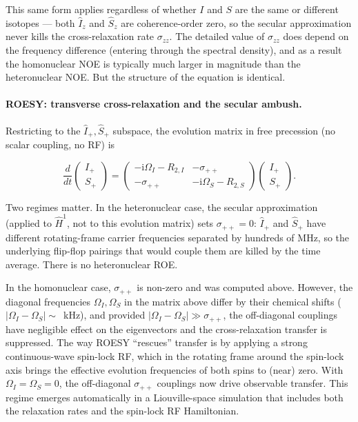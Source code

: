\documentclass[notitlepage,11pt]{article}
\newcommand{\rmi}{\mathrm{i}}
\begin{document}
This same form applies regardless of whether $I$ and $S$ are the same or different isotopes — both $\hat{I}_z$ and $\hat{S}_z$ are coherence-order zero, so the secular approximation never kills the cross-relaxation rate $\sigma_{zz}$. The detailed value of $\sigma_{zz}$ does depend on the frequency difference (entering through the spectral density), and as a result the homonuclear NOE is typically much larger in magnitude than the heteronuclear NOE. But the structure of the equation is identical.

\paragraph{ROESY: transverse cross-relaxation and the secular ambush.} Restricting to the $\hat{I}_+,\hat{S}_+$ subspace, the evolution matrix in free precession (no scalar coupling, no RF) is

\begin{equation}
\frac{d}{dt}  \left(\begin{array}{c} I_+ \\ S_+ \end{array} \right) = 
\left( \begin{array}{cc}  -\rmi \Omega_I - R_{2,I} & -\sigma_{++} \\ -\sigma_{++} &  -\rmi \Omega_S -  R_{2,S} \end{array}\right)
 \left(\begin{array}{c} I_+ \\ S_+ \end{array} \right).
  \end{equation}

Two regimes matter. In the heteronuclear case, the secular approximation (applied to $\hat{H}^1$, not to this evolution matrix) sets $\sigma_{++}=0$: $\hat{I}_+$ and $\hat{S}_+$ have different rotating-frame carrier frequencies separated by hundreds of MHz, so the underlying flip-flop pairings that would couple them are killed by the time average. There is no heteronuclear ROE.

In the homonuclear case, $\sigma_{++}$ is non-zero and was computed above. However, the diagonal frequencies $\Omega_I,\Omega_S$ in the matrix above differ by their chemical shifts ($|\Omega_I-\Omega_S|\sim$~kHz), and provided $|\Omega_I-\Omega_S|\gg\sigma_{++}$, the off-diagonal couplings have negligible effect on the eigenvectors and the cross-relaxation transfer is suppressed. The way ROESY ``rescues'' transfer is by applying a strong continuous-wave spin-lock RF, which in the rotating frame around the spin-lock axis brings the effective evolution frequencies of both spins to (near) zero. With $\Omega_I=\Omega_S=0$, the off-diagonal $\sigma_{++}$ couplings now drive observable transfer. This regime emerges automatically in a Liouville-space simulation that includes both the relaxation rates and the spin-lock RF Hamiltonian.
\end{document}
